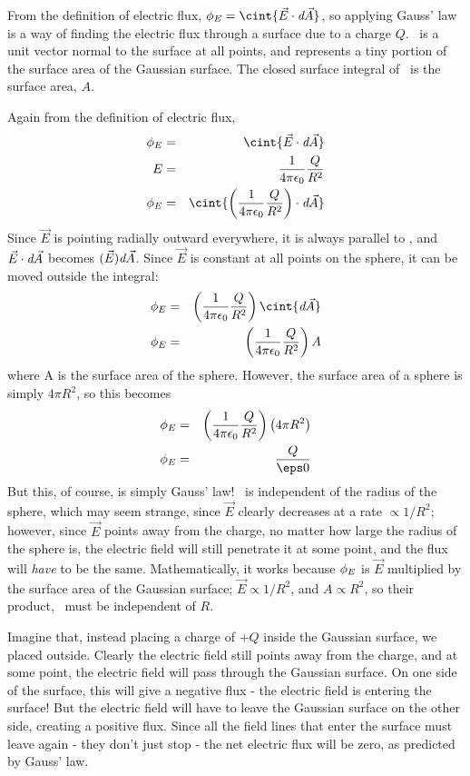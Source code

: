 \documentclass[12pt]{article}
\begin{document}
From the definition of electric flux, $\displaystyle \phie=\cint{\vec{E}\cdot \dA}$, so applying Gauss' law is a way of finding the electric flux through a surface due to a charge $Q$. \dA \ is a unit vector normal to the surface at all points, and represents a tiny portion of the surface area of the Gaussian surface. The closed surface integral of \dA \ is the surface area, $A$.

Again from the definition of electric flux,
\begin{eqnarray*}
\phie &=& \cint{\vec{E}\cdot\dA}\\
E &=& \kei \frac{Q}{R^2}\\
\phie &=& \cint{\left(\kei \frac{Q}{R^2}\right)\cdot\dA}\\
\end{eqnarray*}
Since $\vec{E}$ is pointing radially outward everywhere, it is always parallel to \dA, and $\vec{E}\cdot\emph{d}\vec{A}$ becomes $(\vec{E})\emph{d}\vec{A}$. Since $\vec{E}$ is constant at all points on the sphere, it can be moved outside the integral:
\begin{eqnarray*}
\phie &=& \left(\kei \frac{Q}{R^2}\right)\cint{\dA}\\
\phie &=& \left(\kei \frac{Q}{R^2}\right)A\\
\end{eqnarray*}
where A is the surface area of the sphere. However, the surface area of a sphere is simply $4\pi R^2$, so this becomes
\begin{eqnarray*}
\phie &=& \left(\kei \frac{Q}{R^2}\right)\left(4\pi R^2\right)\\
\phie &=& \frac{Q}{\eps0}\\
\end{eqnarray*}
But this, of course, is simply Gauss' law! \phie \ is independent of the radius of the sphere, which may seem strange, since $\vec{E}$ clearly decreases at a rate $\propto 1/R^2$; however, since $\vec{E}$ points away from the charge, no matter how large the radius of the sphere is, the electric field will still penetrate it at some point, and the flux will \textit{have} to be the same. Mathematically, it works because $\phi_E$ is $\vec{E}$ multiplied by the surface area of the Gaussian surface; $\vec{E} \propto 1/R^2$, and $A\propto R^2$, so their product, \phie \ must be independent of $R$.

Imagine that, instead placing a charge of $+Q$ inside the Gaussian surface, we placed outside. Clearly the electric field still points away from the charge, and at some point, the electric field will pass through the Gaussian surface. On one side of the surface, this will give a negative flux - the electric field is entering the surface! But the electric field will have to leave the Gaussian surface on the other side, creating a positive flux. Since all the field lines that enter the surface must leave again - they don't just stop - the net electric flux will be zero, as predicted by Gauss' law.
\end{document}
